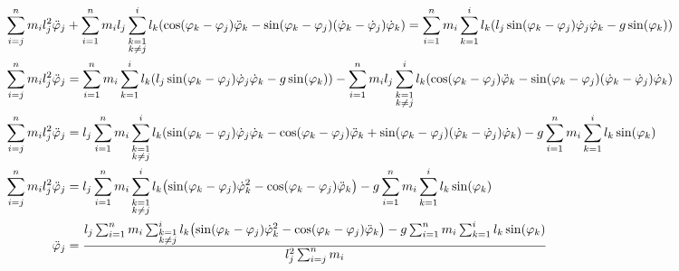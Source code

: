 \documentclass{article}
\renewcommand{\phi}{\varphi}
\begin{document}
\begin{align*}
  \sum_{i=j}^n m_i l_j^2 \ddot\phi_j &+ \sum_{i=1}^n m_i l_j \sum_{\substack{k=1\\k \neq j}}^i l_k \pqty{\cos(\phi_k - \phi_j) \ddot\phi_k - \sin(\phi_k - \phi_j)(\dot\phi_k - \dot\phi_j)\dot\phi_k} = \sum_{i=1}^n m_i \sum_{k=1}^i l_k \pqty{l_j \sin(\phi_k - \phi_j) \dot\phi_j \dot\phi_k - g \sin(\phi_k)} \\
  \sum_{i=j}^n m_i l_j^2 \ddot\phi_j &= \sum_{i=1}^n m_i \sum_{k=1}^i l_k \pqty{l_j \sin(\phi_k - \phi_j) \dot\phi_j \dot\phi_k - g \sin(\phi_k)} - \sum_{i=1}^n m_i l_j \sum_{\substack{k=1\\k \neq j}}^i l_k \pqty{\cos(\phi_k - \phi_j) \ddot\phi_k - \sin(\phi_k - \phi_j)(\dot\phi_k - \dot\phi_j)\dot\phi_k} \\
  \sum_{i=j}^n m_i l_j^2 \ddot\phi_j &= l_j \sum_{i=1}^n m_i \sum_{\substack{k=1\\k \neq j}}^i l_k \pqty{\sin(\phi_k - \phi_j) \dot\phi_j \dot\phi_k - \cos(\phi_k - \phi_j) \ddot\phi_k + \sin(\phi_k - \phi_j)(\dot\phi_k - \dot\phi_j)\dot\phi_k} - g \sum_{i=1}^n m_i \sum_{k=1}^i l_k \sin(\phi_k) \\
  \sum_{i=j}^n m_i l_j^2 \ddot\phi_j &= l_j \sum_{i=1}^n m_i \sum_{\substack{k=1\\k \neq j}}^i l_k \pqty{\sin(\phi_k - \phi_j) \dot\phi_k^2 - \cos(\phi_k - \phi_j) \ddot\phi_k} - g \sum_{i=1}^n m_i \sum_{k=1}^i l_k \sin(\phi_k) \\
  \ddot\phi_j &= \frac{l_j \sum_{i=1}^n m_i \sum_{\substack{k=1\\k \neq j}}^i l_k \pqty{\sin(\phi_k - \phi_j) \dot\phi_k^2 - \cos(\phi_k - \phi_j) \ddot\phi_k} - g \sum_{i=1}^n m_i \sum_{k=1}^i l_k \sin(\phi_k)}{l_j^2 \sum_{i=j}^n m_i} \\
\end{align*}
\end{document}
